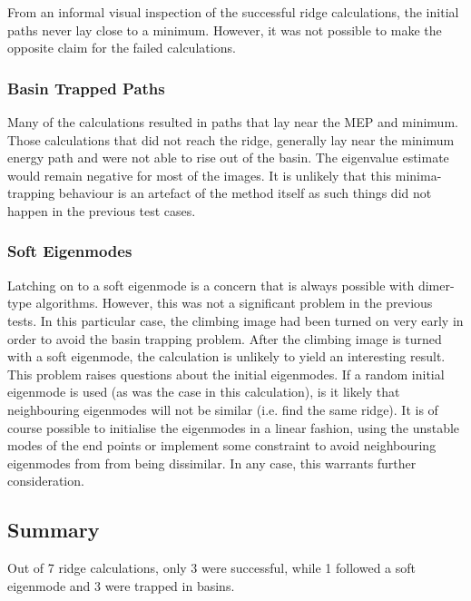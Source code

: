 From an informal visual inspection of the successful ridge calculations, the initial paths never lay close to a minimum.
However, it was not possible to make the opposite claim for the failed calculations.

\subsubsection{Basin Trapped Paths}
Many of the calculations resulted in paths that lay near the MEP and minimum.
Those calculations that did not reach the ridge, generally lay near the minimum energy path and were not able to rise out of the basin.
The eigenvalue estimate would remain negative for most of the images.
It is unlikely that this minima-trapping behaviour is an artefact of the method itself as such things did not happen in the previous test cases.

\subsubsection{Soft Eigenmodes}
Latching on to a soft eigenmode is a concern that is always possible with dimer-type algorithms.
However, this was not a significant problem in the previous tests.
In this particular case, the climbing image had been turned on very early in order to avoid the basin trapping problem.
After the climbing image is turned with a soft eigenmode, the calculation is unlikely to yield an interesting result.
This problem raises questions about the initial eigenmodes.
If a random initial eigenmode is used (as was the case in this calculation), is it likely that neighbouring eigenmodes will not be similar (i.e. find the same ridge).
It is of course possible to initialise the eigenmodes in a linear fashion, using the unstable modes of the end points or implement some constraint to avoid neighbouring eigenmodes from from being dissimilar.
In any case, this warrants further consideration.

\subsection{Summary}
Out of 7 ridge calculations, only 3 were successful, while 1 followed a soft eigenmode and 3 were trapped in basins.




